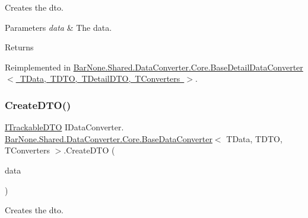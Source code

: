 Creates the dto. 


\begin{DoxyParams}{Parameters}
{\em data} & The data.\\
\hline
\end{DoxyParams}
\begin{DoxyReturn}{Returns}

\end{DoxyReturn}


Reimplemented in \mbox{\hyperlink{class_bar_none_1_1_shared_1_1_data_converter_1_1_core_1_1_base_detail_data_converter_a70b8d006525ede0e8be34f3fcbf71bb9}{Bar\+None.\+Shared.\+Data\+Converter.\+Core.\+Base\+Detail\+Data\+Converter$<$ T\+Data, T\+D\+T\+O, T\+Detail\+D\+T\+O, T\+Converters $>$}}.

\mbox{\label{class_bar_none_1_1_shared_1_1_data_converter_1_1_core_1_1_base_data_converter_a4ff5c2a02efd291a7a0240648328c57f}} 
\subsubsection{\texorpdfstring{Create\+D\+T\+O()}{CreateDTO()}\hspace{0.1cm}{\footnotesize\ttfamily [2/2]}}
{\footnotesize\ttfamily \mbox{\hyperlink{interface_bar_none_1_1_shared_1_1_core_1_1_i_trackable_d_t_o}{I\+Trackable\+D\+TO}} I\+Data\+Converter. \mbox{\hyperlink{class_bar_none_1_1_shared_1_1_data_converter_1_1_core_1_1_base_data_converter}{Bar\+None.\+Shared.\+Data\+Converter.\+Core.\+Base\+Data\+Converter}}$<$ T\+Data, T\+D\+TO, T\+Converters $>$.Create\+D\+TO (\begin{DoxyParamCaption}\item[{\mbox{\hyperlink{interface_bar_none_1_1_shared_1_1_core_1_1_i_trackable}{I\+Trackable}}}]{data }\end{DoxyParamCaption})\hspace{0.3cm}{\ttfamily [private]}}



Creates the dto. 


